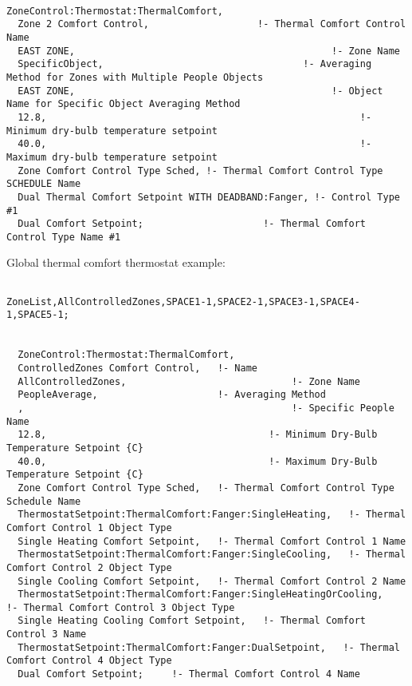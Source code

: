 \begin{lstlisting}

ZoneControl:Thermostat:ThermalComfort,
  Zone 2 Comfort Control,                   !- Thermal Comfort Control Name
  EAST ZONE,                                             !- Zone Name
  SpecificObject,                                   !- Averaging Method for Zones with Multiple People Objects
  EAST ZONE,                                             !- Object Name for Specific Object Averaging Method
  12.8,                                                       !- Minimum dry-bulb temperature setpoint
  40.0,                                                       !- Maximum dry-bulb temperature setpoint
  Zone Comfort Control Type Sched, !- Thermal Comfort Control Type SCHEDULE Name
  Dual Thermal Comfort Setpoint WITH DEADBAND:Fanger, !- Control Type #1
  Dual Comfort Setpoint;                     !- Thermal Comfort Control Type Name #1
\end{lstlisting}

Global thermal comfort thermostat example:

\begin{lstlisting}

ZoneList,AllControlledZones,SPACE1-1,SPACE2-1,SPACE3-1,SPACE4-1,SPACE5-1;


  ZoneControl:Thermostat:ThermalComfort,
  ControlledZones Comfort Control,   !- Name
  AllControlledZones,                             !- Zone Name
  PeopleAverage,                     !- Averaging Method
  ,                                               !- Specific People Name
  12.8,                                       !- Minimum Dry-Bulb Temperature Setpoint {C}
  40.0,                                       !- Maximum Dry-Bulb Temperature Setpoint {C}
  Zone Comfort Control Type Sched,   !- Thermal Comfort Control Type Schedule Name
  ThermostatSetpoint:ThermalComfort:Fanger:SingleHeating,   !- Thermal Comfort Control 1 Object Type
  Single Heating Comfort Setpoint,   !- Thermal Comfort Control 1 Name
  ThermostatSetpoint:ThermalComfort:Fanger:SingleCooling,   !- Thermal Comfort Control 2 Object Type
  Single Cooling Comfort Setpoint,   !- Thermal Comfort Control 2 Name
  ThermostatSetpoint:ThermalComfort:Fanger:SingleHeatingOrCooling,   !- Thermal Comfort Control 3 Object Type
  Single Heating Cooling Comfort Setpoint,   !- Thermal Comfort Control 3 Name
  ThermostatSetpoint:ThermalComfort:Fanger:DualSetpoint,   !- Thermal Comfort Control 4 Object Type
  Dual Comfort Setpoint;     !- Thermal Comfort Control 4 Name
\end{lstlisting}

